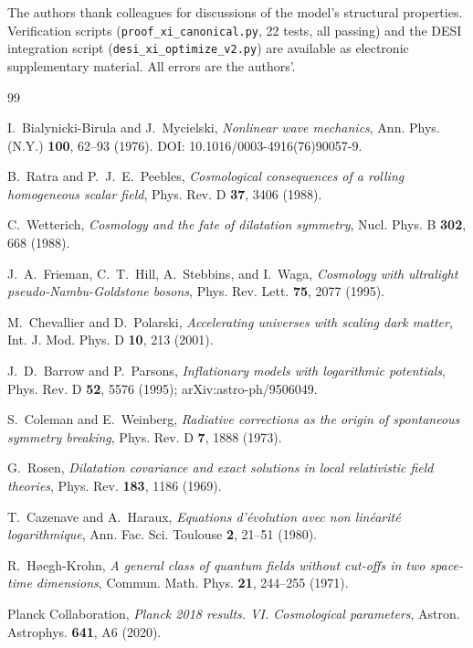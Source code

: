 \documentclass[11pt,reqno]{amsart}
\theoremstyle{plain}
\theoremstyle{definition}
\theoremstyle{remark}
\begin{document}
The authors thank colleagues for discussions of the model's structural
properties. Verification scripts (\texttt{proof\_xi\_canonical.py}, 22
tests, all passing) and the DESI integration script
(\texttt{desi\_xi\_optimize\_v2.py}) are available as electronic
supplementary material. All errors are the authors'.

\begin{thebibliography}{99}

I.~Bialynicki-Birula and J.~Mycielski,
\emph{Nonlinear wave mechanics},
Ann. Phys. (N.Y.) \textbf{100}, 62--93 (1976).
DOI: 10.1016/0003-4916(76)90057-9.

B.~Ratra and P.~J.~E.~Peebles,
\emph{Cosmological consequences of a rolling homogeneous scalar field},
Phys. Rev. D \textbf{37}, 3406 (1988).

C.~Wetterich,
\emph{Cosmology and the fate of dilatation symmetry},
Nucl. Phys. B \textbf{302}, 668 (1988).

J.~A.~Frieman, C.~T.~Hill, A.~Stebbins, and I.~Waga,
\emph{Cosmology with ultralight pseudo-Nambu-Goldstone bosons},
Phys. Rev. Lett. \textbf{75}, 2077 (1995).

M.~Chevallier and D.~Polarski,
\emph{Accelerating universes with scaling dark matter},
Int. J. Mod. Phys. D \textbf{10}, 213 (2001).

J.~D.~Barrow and P.~Parsons,
\emph{Inflationary models with logarithmic potentials},
Phys. Rev. D \textbf{52}, 5576 (1995); arXiv:astro-ph/9506049.

S.~Coleman and E.~Weinberg,
\emph{Radiative corrections as the origin of spontaneous symmetry breaking},
Phys. Rev. D \textbf{7}, 1888 (1973).

G.~Rosen,
\emph{Dilatation covariance and exact solutions in local relativistic field theories},
Phys. Rev. \textbf{183}, 1186 (1969).

T.~Cazenave and A.~Haraux,
\emph{Equations d'\'evolution avec non lin\'earit\'e logarithmique},
Ann. Fac. Sci. Toulouse \textbf{2}, 21--51 (1980).

R.~H\o egh-Krohn,
\emph{A general class of quantum fields without cut-offs in two space-time dimensions},
Commun. Math. Phys. \textbf{21}, 244--255 (1971).

Planck Collaboration,
\emph{Planck 2018 results. VI. Cosmological parameters},
Astron. Astrophys. \textbf{641}, A6 (2020).


\end{thebibliography}
\end{document}
